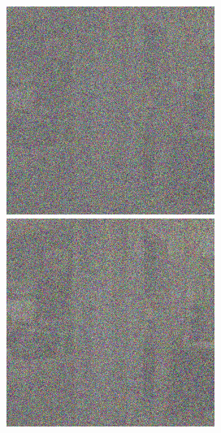 \begin{figure}[H]
  \centering
  \begin{minipage}[b]{0.3\linewidth}
\includegraphics[width=\linewidth]{Picture/progress/random/x_0500.png}
  \end{minipage}
  \hspace{0.1cm} %
   \begin{minipage}[b]{0.3\linewidth}
    \includegraphics[width=\linewidth]{Picture/progress/random/x_0400.png}

\end{minipage}
\end{figure}
